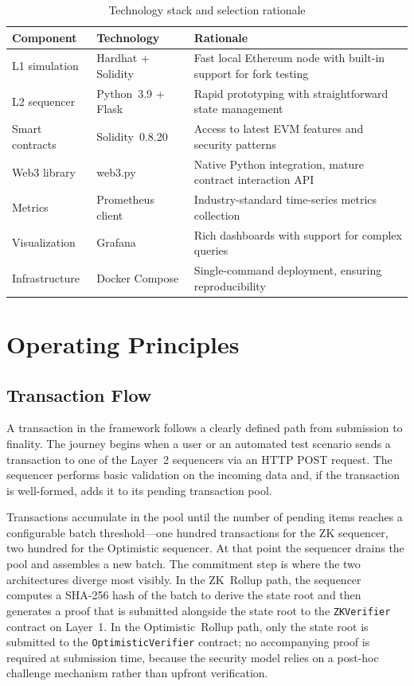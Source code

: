 \documentclass[
]{elteikthesis}[2024/04/26]
\begin{document}
\begin{table}[h]
    \centering
    \begin{tabular}{l|l|p{5cm}}
        \hline
        \textbf{Component} & \textbf{Technology} & \textbf{Rationale} \\
        \hline
        L1 simulation & Hardhat + Solidity & Fast local Ethereum node with built-in support for fork testing \\
        \hline
        L2 sequencer & Python~3.9 + Flask & Rapid prototyping with straightforward state management \\
        \hline
        Smart contracts & Solidity~0.8.20 & Access to latest EVM features and security patterns \\
        \hline
        Web3 library & web3.py & Native Python integration, mature contract interaction API \\
        \hline
        Metrics & Prometheus client & Industry-standard time-series metrics collection \\
        \hline
        Visualization & Grafana & Rich dashboards with support for complex queries \\
        \hline
        Infrastructure & Docker Compose & Single-command deployment, ensuring reproducibility \\
        \hline
    \end{tabular}
    \caption{Technology stack and selection rationale}
    \label{tab:tech-stack}
\end{table}

\section{Operating Principles}

\subsection{Transaction Flow}

A transaction in the framework follows a clearly defined path from submission to finality. The journey begins when a user or an automated test scenario sends a transaction to one of the Layer~2 sequencers via an HTTP POST request. The sequencer performs basic validation on the incoming data and, if the transaction is well-formed, adds it to its pending transaction pool.

Transactions accumulate in the pool until the number of pending items reaches a configurable batch threshold---one hundred transactions for the ZK sequencer, two hundred for the Optimistic sequencer. At that point the sequencer drains the pool and assembles a new batch. The commitment step is where the two architectures diverge most visibly. In the ZK~Rollup path, the sequencer computes a SHA-256 hash of the batch to derive the state root and then generates a proof that is submitted alongside the state root to the \texttt{ZKVerifier} contract on Layer~1. In the Optimistic~Rollup path, only the state root is submitted to the \texttt{OptimisticVerifier} contract; no accompanying proof is required at submission time, because the security model relies on a post-hoc challenge mechanism rather than upfront verification.
\end{document}
